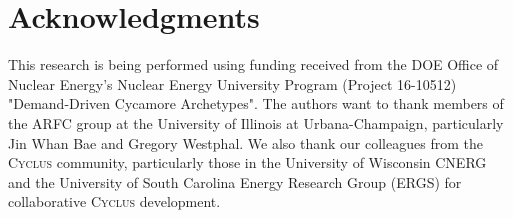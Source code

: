 \documentclass{anstrans}
\newcommand{\Cyclus}{\textsc{Cyclus}\xspace}%
\begin{document}
\section{Acknowledgments}
This research is being performed using funding received from the \gls{DOE} Office of 
Nuclear Energy's Nuclear Energy University Program (Project 16-10512) 
"Demand-Driven Cycamore Archetypes". The authors want to thank members of the 
\gls{ARFC} group at the University of Illinois at Urbana-Champaign, 
particularly Jin Whan Bae and Gregory Westphal. We also thank our colleagues 
from the \Cyclus community, particularly those in the University of Wisconsin 
\gls{CNERG} and the University of South Carolina Energy Research Group (ERGS) 
for collaborative \Cyclus development.



\end{document}
